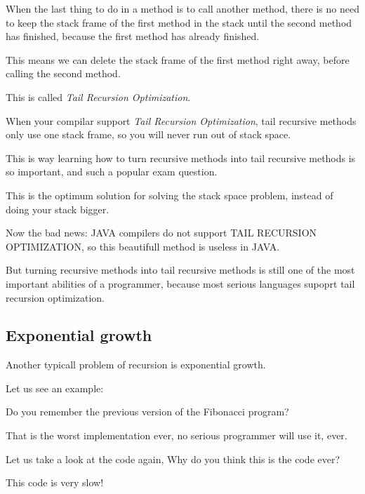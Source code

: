 \documentclass[a4paper, 9pt]{extarticle}
\begin{document}
When the last thing to do in a method is to call another method, there is no
need to keep the stack frame of the first method in the stack until the second
method has finished, because the first method has already finished.

This means we can delete the stack frame of the first method right away, before
calling the second method.

This is called \emph{Tail Recursion Optimization}.

When your compilar support \emph{Tail Recursion Optimization}, tail recursive
methods only use one stack frame, so you will never run out of stack space.

This is way learning how to turn recursive methods into tail recursive methods
is so important, and such a popular exam question.

This is the optimum solution for solving the stack space problem, instead of
doing your stack bigger.

Now the bad news: JAVA compilers do not support TAIL RECURSION OPTIMIZATION, so
this beautifull method is useless in JAVA.

But turning recursive methods into tail recursive methods is still one of the
most important abilities of a programmer, because most serious languages
supoprt tail recursion optimization.



\subsection{Exponential growth}

Another typicall problem of recursion is exponential growth.

Let us see an example:

Do you remember the previous version of the Fibonacci program?

That is the worst implementation ever, no serious programmer will use it, ever.

Let us take a look at the code again, Why do you think this is the code ever?


This code is very slow!

\end{document}
